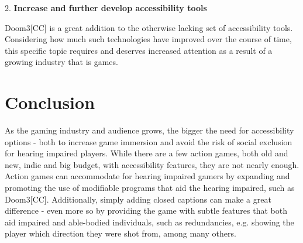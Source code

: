 \documentclass{scrartcl}
\begin{document}
2.	\textbf{Increase and further develop accessibility tools}

\hspace{-4mm}Doom3[CC] is a great addition to the otherwise lacking set of accessibility tools. Considering how much such technologies have improved over the course of time, this specific topic requires and deserves increased attention as a result of a growing industry that is games.

\section{Conclusion}

As the gaming industry and audience grows, the bigger the need for accessibility options - both to increase game immersion and avoid the risk of social exclusion for hearing impaired players. While there are a few action games, both old and new, indie and big budget, with accessibility features, they are not nearly enough. Action games can accommodate for hearing impaired gamers by expanding and promoting the use of modifiable programs that aid the hearing impaired, such as Doom3[CC]. Additionally, simply adding closed captions can make a great difference - even more so by providing the game with subtle features that both aid impaired and able-bodied individuals, such as redundancies, e.g. showing the player which direction they were shot from, among many others.



\end{document}
